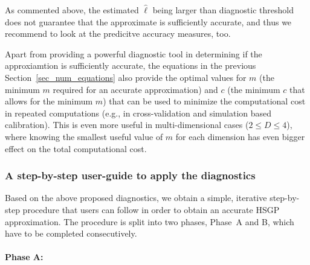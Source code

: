 As commented above, the estimated $\hat{\ell}$ being larger than diagnostic threshold does not guarantee that the approximate is sufficiently accurate, and thus we recommend to look at the predicitve accuracy measures, too.

Apart from providing a powerful diagnostic tool in determining if the approxiamtion is sufficiently accurate, the equations in the previous Section~\ref{sec_num_equations} also provide the optimal values for $m$ (the minimum $m$ required for an accurate approximation) and $c$ (the minimum $c$ that allows for the minimum $m$) that can be used to minimize the computational cost in repeated computations (e.g., in cross-validation and simulation based calibration).
This is even more useful in multi-dimensional cases ($2 \leq D \leq 4$), where knowing the smallest useful value of $m$ for each dimension has even bigger effect on the total computational cost.

\subsubsection{A step-by-step user-guide to apply the diagnostics} \label{sec_user_guide}

Based on the above proposed diagnostics, we obtain a simple, iterative step-by-step procedure that users can follow in order to obtain an accurate HSGP approximation. The procedure is split into two phases, Phase~A and B, which have to be completed consecutively.

\paragraph*{Phase A:}


